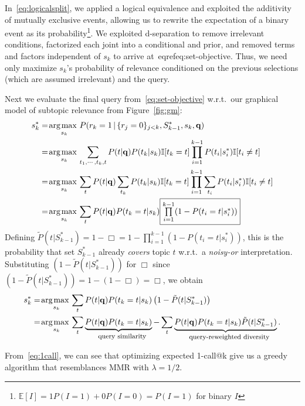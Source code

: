 In~\eqref{eq:logicalsplit}, we applied a logical equivalence and exploited the additivity of
mutually exclusive events, allowing us to rewrite the expectation of a binary event as its
probability\footnote{$\mathbb{E}[I] = 1P(I=1) + 0P(I=0) = P(I=1)$ for binary $I$}.
We exploited d-separation to remove irrelevant conditions, 
factorized each joint into a conditional and prior, and
removed terms and factors independent of $s_k$ to arrive at~eqref{eq:set-objective}.  Thus, we 
need only maximize $s_k$'s probability of relevance
conditioned on the previous selections (which are assumed irrelevant) and the query.

Next we evaluate the final query from~\eqref{eq:set-objective} w.r.t.\
our graphical model of subtopic relevance from Figure~\ref{fig:gm}:
\begin{align}
s_k^* & = \argmax_{s_{k}} P( r_k=1 \, | \, \{ r_{j}=0 \}_{j<k}, S_{k-1}^*,s_k,\vec{q}) \nonumber \\
& = \argmax_{s_{k}} \sum_{t_1, \cdots, t_{k}, t} P(t|\vec{q}) P(t_k|s_k) \I[t_k = t] \prod_{i=1}^{k-1} P(t_i|s_i^*) \I[t_i\neq t]\nonumber \\
& = \argmax_{s_{k}} \sum_{t} P(t|\vec{q}) \sum_{t_{k}} P(t_k|s_k) \I[t_k = t] \prod_{i=1}^{k-1} \sum_{t_{i}} P(t_i|s_i^*) \I[t_i \neq t]\nonumber \\
& = \argmax_{s_{k}} \sum_{t} P(t|\vec{q}) P(t_k=t|s_k) \fbox{$\prod\limits_{i=1}^{k-1} (1 - P(t_i=t|s_i^*))$} \label{eq:partial_simp}
\end{align}
Defining $\tilde{P}(t | S_{k-1}^*) = 1 - \Box = 1 - \prod_{i=1}^{k-1} (1 -
  P(t_i=t|s_i^*))$, this is the probability that 
set $S_{k-1}^*$ already \emph{covers} topic $t$ 
w.r.t.\ a \emph{noisy-or} interpretation.  Substituting
$(1 - \tilde{P}(t | S_{k-1}^*))$ for $\Box$ since 
$(1 - \tilde{P}(t | S_{k-1}^*)) = 1 - (1 - \Box) = \Box$, we obtain
\begin{align}
s_k^* & = \argmax_{s_{k}} \sum_{t} P(t|\vec{q}) P(t_k=t|s_k) \left( 1 - \tilde{P}(t | S_{k-1}^*) \right) \nonumber \\
      & = \argmax_{s_{k}} \sum_{t} \underbrace{P(t|\vec{q}) P(t_k=t|s_k)}_{\mbox{\footnotesize query similarity}} - \sum_{t} \underbrace{P(t|\vec{q}) P(t_k=t|s_k) \tilde{P}(t | S_{k-1}^*)}_{\mbox{\footnotesize query-reweighted diversity}}. \label{eq:1call}
\end{align}

From~\eqref{eq:1call}, we can see that optimizing expected 1-call@k give us a greedy algorithm that resemblances MMR with $\lambda = 1/2$.


